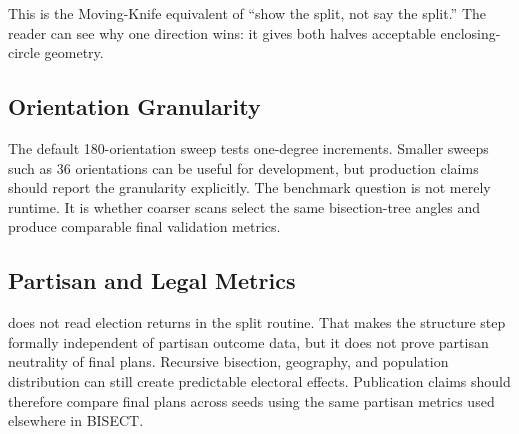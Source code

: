 This is the Moving-Knife equivalent of ``show the split, not say the split.''
The reader can see why one direction wins: it gives both halves acceptable
enclosing-circle geometry.

\subsection{Orientation Granularity}

The default 180-orientation sweep tests one-degree increments. Smaller sweeps
such as 36 orientations can be useful for development, but production claims
should report the granularity explicitly. The benchmark question is not merely
runtime. It is whether coarser scans select the same bisection-tree angles and
produce comparable final validation metrics.

\subsection{Partisan and Legal Metrics}

\mka{} does not read election returns in the split routine. That makes the
structure step formally independent of partisan outcome data, but it does not
prove partisan neutrality of final plans. Recursive bisection, geography, and
population distribution can still create predictable electoral effects.
Publication claims should therefore compare final plans across seeds using the
same partisan metrics used elsewhere in BISECT.
